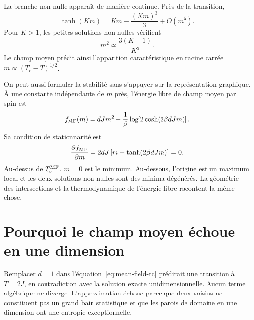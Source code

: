 La branche non nulle apparaît de manière continue. Près de la transition,
\begin{equation}
\tanh(Km)=Km-\frac{(Km)^3}{3}+O(m^5).
\end{equation}
Pour \(K>1\), les petites solutions non nulles vérifient
\begin{equation}
m^2\simeq \frac{3(K-1)}{K^3}.
\end{equation}
Le champ moyen prédit ainsi l’apparition caractéristique en racine carrée \(m\propto(T_c-T)^{1/2}\).

On peut aussi formuler la stabilité sans s’appuyer sur la représentation graphique. À une constante indépendante de \(m\) près, l’énergie libre de champ moyen par spin est
\begin{equation}
f_{\rm MF}(m)
=dJm^2-\frac{1}{\beta}
\log\!\left[2\cosh(2\beta dJm)\right].
\label{eq:mf-free-energy}
\end{equation}
Sa condition de stationnarité est
\begin{equation}
\frac{\partial f_{\rm MF}}{\partial m}
=2dJ\left[m-\tanh(2\beta dJm)\right]=0.
\end{equation}
Au-dessus de \(T_c^{\rm MF}\), \(m=0\) est le minimum. Au-dessous, l’origine est un maximum local et les deux solutions non nulles sont des minima dégénérés. La géométrie des intersections et la thermodynamique de l’énergie libre racontent la même chose.

\begin{classroomqa}\end{classroomqa}

\section{Pourquoi le champ moyen échoue en une dimension}

Remplacer \(d=1\) dans l’équation~\eqref{eq:mean-field-tc} prédirait une transition à \(T=2J\), en contradiction avec la solution exacte unidimensionnelle. Aucun terme algébrique ne diverge. L’approximation échoue parce que deux voisins ne constituent pas un grand bain statistique et que les parois de domaine en une dimension ont une entropie exceptionnelle.

